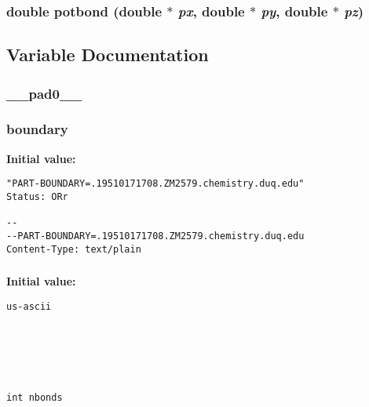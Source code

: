 \subsubsection{\setlength{\rightskip}{0pt plus 5cm}double potbond (double $\ast$ {\em px}, double $\ast$ {\em py}, double $\ast$ {\em pz})}\label{md__fmorse_8c_69fa49ba666e9da77eff6f750877b742}




\subsection{Variable Documentation}
\subsubsection{ {\bf \_\-\_\-pad0\_\-\_\-}}\label{md__fmorse_8c_0d721bcd462f793b460e09a5117ad0e0}


\subsubsection{ {\bf boundary}}\label{md__fmorse_8c_05bf9062e7680ad5939999d0a17936c1}


{\bf Initial value:}

\footnotesize\begin{verbatim}"PART-BOUNDARY=.19510171708.ZM2579.chemistry.duq.edu"
Status: ORr

--
--PART-BOUNDARY=.19510171708.ZM2579.chemistry.duq.edu
Content-Type: text/plain
\end{verbatim}\normalsize 
{}
\subsubsection{}\label{md__fmorse_8c_8bd4accafd4e712317ed9a471738a971}


{\bf Initial value:}

\footnotesize\begin{verbatim}us-ascii




 

int nbonds
\end{verbatim}\normalsize 
{}
